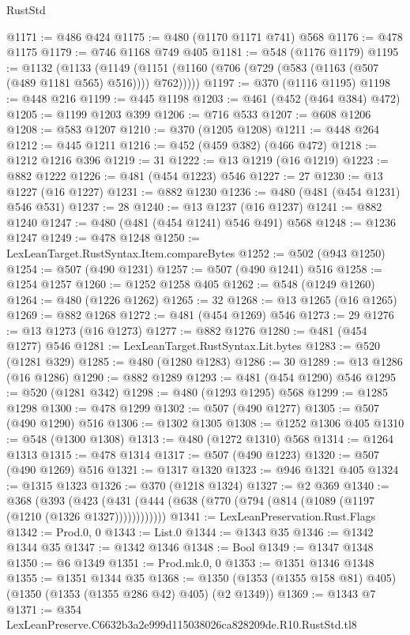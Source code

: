 \begin{lexlean}{RustStd}
\begin{coremodule}
@1171 := @486 @424
@1175 := @480 (@1170 @1171 @741) @568
@1176 := @478 @1175
@1179 := @746 @1168 @749 @405
@1181 := @548 (@1176 @1179)
@1195 := @1132
    (@1133 (@1149 (@1151 (@1160 (@706 (@729 (@583 (@1163 (@507 (@489 @1181 @565) @516)))) @762)))))
@1197 := @370 (@1116 @1195)
@1198 := @448 @216
@1199 := @445 @1198
@1203 := @461 (@452 (@464 @384) @472)
@1205 := @1199 @1203 @399
@1206 := @716 @533
@1207 := @608 @1206
@1208 := @583 @1207
@1210 := @370 (@1205 @1208)
@1211 := @448 @264
@1212 := @445 @1211
@1216 := @452 (@459 @382) (@466 @472)
@1218 := @1212 @1216 @396
@1219 := 31
@1222 := @13 @1219 (@16 @1219)
@1223 := @882 @1222
@1226 := @481 (@454 @1223) @546
@1227 := 27
@1230 := @13 @1227 (@16 @1227)
@1231 := @882 @1230
@1236 := @480 (@481 (@454 @1231) @546 @531)
@1237 := 28
@1240 := @13 @1237 (@16 @1237)
@1241 := @882 @1240
@1247 := @480 (@481 (@454 @1241) @546 @491) @568
@1248 := @1236 @1247
@1249 := @478 @1248
@1250 := LexLeanTarget.RustSyntax.Item.compareBytes
@1252 := @502 (@943 @1250)
@1254 := @507 (@490 @1231)
@1257 := @507 (@490 @1241) @516
@1258 := @1254 @1257
@1260 := @1252 @1258 @405
@1262 := @548 (@1249 @1260)
@1264 := @480 (@1226 @1262)
@1265 := 32
@1268 := @13 @1265 (@16 @1265)
@1269 := @882 @1268
@1272 := @481 (@454 @1269) @546
@1273 := 29
@1276 := @13 @1273 (@16 @1273)
@1277 := @882 @1276
@1280 := @481 (@454 @1277) @546
@1281 := LexLeanTarget.RustSyntax.Lit.bytes
@1283 := @520 (@1281 @329)
@1285 := @480 (@1280 @1283)
@1286 := 30
@1289 := @13 @1286 (@16 @1286)
@1290 := @882 @1289
@1293 := @481 (@454 @1290) @546
@1295 := @520 (@1281 @342)
@1298 := @480 (@1293 @1295) @568
@1299 := @1285 @1298
@1300 := @478 @1299
@1302 := @507 (@490 @1277)
@1305 := @507 (@490 @1290) @516
@1306 := @1302 @1305
@1308 := @1252 @1306 @405
@1310 := @548 (@1300 @1308)
@1313 := @480 (@1272 @1310) @568
@1314 := @1264 @1313
@1315 := @478 @1314
@1317 := @507 (@490 @1223)
@1320 := @507 (@490 @1269) @516
@1321 := @1317 @1320
@1323 := @946 @1321 @405
@1324 := @1315 @1323
@1326 := @370 (@1218 @1324)
@1327 := @2 @369
@1340 := @368
    (@393 (@423 (@431 (@444 (@638 (@770 (@794 (@814 (@1089 (@1197 (@1210 (@1326 @1327))))))))))))
@1341 := LexLeanPreservation.Rust.Flags
@1342 := Prod.{0, 0}
@1343 := List.{0}
@1344 := @1343 @35
@1346 := @1342 @1344 @35
@1347 := @1342 @1346
@1348 := Bool
@1349 := @1347 @1348
@1350 := @6 @1349
@1351 := Prod.mk.{0, 0}
@1353 := @1351 @1346 @1348
@1355 := @1351 @1344 @35
@1368 := @1350 (@1353 (@1355 @158 @81) @405) (@1350 (@1353 (@1355 @286 @42) @405) (@2 @1349))
@1369 := @1343 @7
@1371 := @354 LexLeanPreserve.C6632b3a2e999d115038026ca828209de.R10.RustStd.tl8

\end{coremodule}
\end{lexlean}
